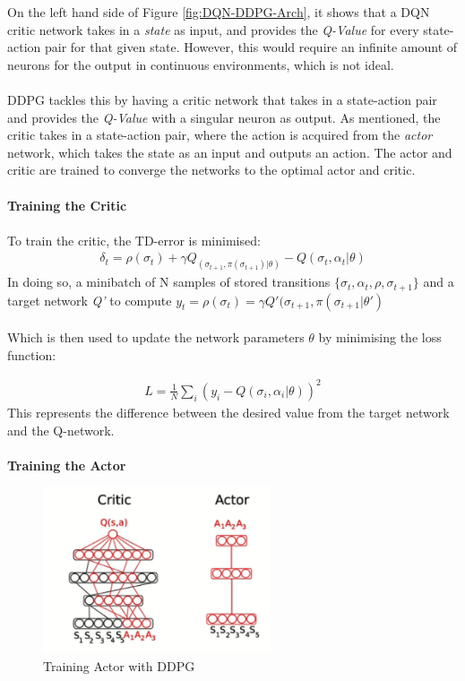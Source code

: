 \documentclass[ %
                    author={Ashwinder Khurana},
                supervisor={Prof Dave Cliff},
                    degree={MEng},
                     title={The Deeply Reinforced Trader},
                  subtitle={},
                      type={enterprise},
                      year={2020} ]{dissertation}
\begin{document}
{\begin{figure}[H]
\end{figure}
\noindent
On the left hand side of Figure \ref{fig:DQN-DDPG-Arch}, it shows that a DQN critic network takes in a \textit{state} as input, and provides the \textit{Q-Value} for every state-action pair for that given state. However, this would require an infinite amount of neurons for the output in continuous environments, which is not ideal.
\\
\\
DDPG tackles this by having a critic network that takes in a state-action pair and provides the \textit{Q-Value} with a singular neuron as output. As mentioned, the critic takes in a state-action pair, where the action is acquired from the \textit{actor} network, which takes the state as an input and outputs an action. The actor and critic are trained to converge the networks to the optimal actor and critic.
\\
\\
\textbf{Training the Critic}
\\
\\
To train the critic, the TD-error is minimised:
\begin{equation}
\begin{split}
\delta_t = \rho(\sigma_t) + \gamma Q_(\sigma_{t+1}, \pi(\sigma_{t+1})|\theta) - Q(\sigma_t, \alpha_t | \theta) 
\end{split}
\end{equation}
In doing so, a minibatch of N samples of stored transitions $\{\sigma_t, \alpha_t, \rho, \sigma_{t+1}\}$ and a target network \textit{Q'}  to compute $y_t = \rho(\sigma_t) = \gamma Q'(\sigma_{t+1}, \pi(\sigma_{t+1} | \theta')$
\\
\\
\noindent
Which is then used to update the network parameters $\theta$ by minimising the loss function:

\begin{equation}
\begin{split}
L = \frac{1}{N} \sum^{}_{i}(y_i - Q(\sigma_i, \alpha_i | \theta))^{2}
\end{split}
\end{equation}
\noindent
This represents the difference between the desired value from the target network and the Q-network.
\\
\\
\textbf{Training the Actor}
\begin{figure}[H]
  
	\centering
  	\includegraphics[width=0.6\textwidth]{Training-Actor.png}
  	\caption{Training Actor with DDPG}
	 \label{fig:Training-Actor}


\end{figure}}
\end{document}
